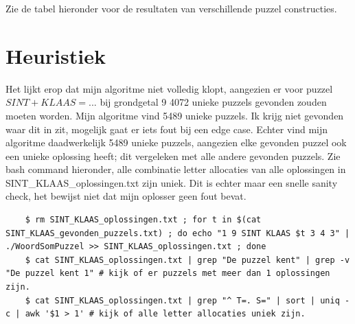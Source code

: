 \documentclass[twocolumn,10pt]{article}
\begin{document}
Zie de tabel hieronder voor de resultaten van verschillende puzzel constructies.
\begin{table}[h]
    \centering
    \caption{Resultaten van verschillende constructies.}
\end{table}
\FloatBarrier

\section*{Heuristiek}
Het lijkt erop dat mijn algoritme niet volledig klopt, aangezien er voor puzzel $SINT+KLAAS=...$ bij grondgetal 9 4072 unieke puzzels gevonden zouden moeten worden.
Mijn algoritme vind 5489 unieke puzzels. Ik krijg niet gevonden waar dit in zit, mogelijk gaat er iets fout bij een edge case. 
Echter vind mijn algoritme daadwerkelijk 5489 unieke puzzels, aangezien elke gevonden puzzel ook een unieke oplossing heeft; dit vergeleken met alle andere gevonden puzzels.
Zie bash command hieronder, alle combinatie letter allocaties van alle oplossingen in SINT\_KLAAS\_oplossingen.txt zijn uniek.
Dit is echter maar een snelle sanity check, het bewijst niet dat mijn oplosser geen fout bevat.

\begin{lstlisting}
    $ rm SINT_KLAAS_oplossingen.txt ; for t in $(cat SINT_KLAAS_gevonden_puzzels.txt) ; do echo "1 9 SINT KLAAS $t 3 4 3" | ./WoordSomPuzzel >> SINT_KLAAS_oplossingen.txt ; done
    $ cat SINT_KLAAS_oplossingen.txt | grep "De puzzel kent" | grep -v "De puzzel kent 1" # kijk of er puzzels met meer dan 1 oplossingen zijn.
    $ cat SINT_KLAAS_oplossingen.txt | grep "^ T=. S=" | sort | uniq -c | awk '$1 > 1' # kijk of alle letter allocaties uniek zijn.
\end{lstlisting}
\end{document}
